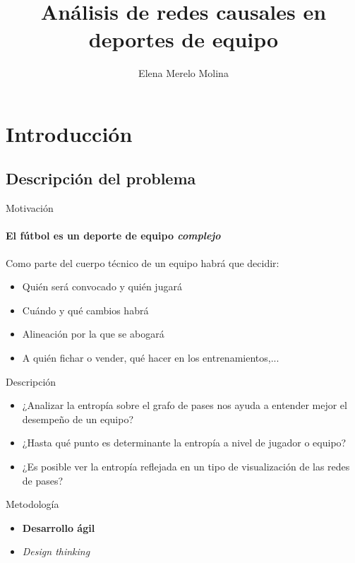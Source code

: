 \documentclass{beamer}
\title[Análisis de redes causales en deportes de equipo]{Análisis de redes causales en deportes de equipo}
\author[E. Merelo]{Elena Merelo Molina}
\begin{document}
	\typesetFrontSlides


\section{Introducción}

\subsection[Problema]{Descripción del problema}

\begin{frame}{Motivación}
	\framesubtitle{El fútbol es un deporte de equipo \textit{complejo}}
    Como parte del cuerpo técnico de un equipo habrá que decidir:
    \begin{itemize}
		\item Quién será convocado y quién jugará
        \item Cuándo y qué cambios habrá
        \item Alineación por la que se abogará
        \item A quién fichar o vender, qué hacer en los entrenamientos,... 
	\end{itemize}
\end{frame}

\begin{frame}{Descripción}
	\begin{itemize}
		\item ¿Analizar la entropía sobre el grafo de pases nos ayuda a entender mejor el desempeño de un equipo?
		\item ¿Hasta qué punto es determinante la entropía a nivel de jugador o equipo?
        \item ¿Es posible ver la entropía reflejada en un tipo de visualización de las redes de pases?
	\end{itemize}
\end{frame}

\begin{frame}{Metodología}
	\begin{itemize}
		\item \textbf{Desarrollo ágil}
		\item \textit{Design thinking}
	\end{itemize}
\end{frame}

\end{document}

